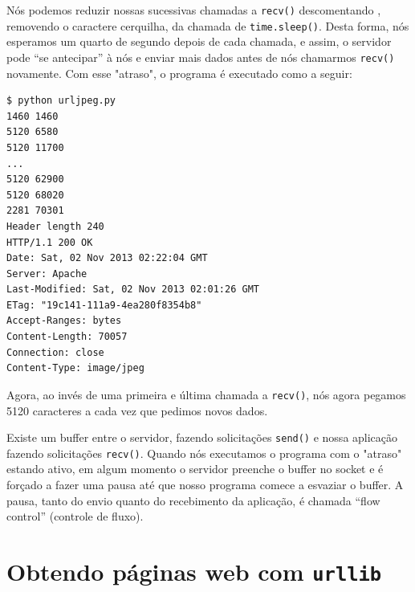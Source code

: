 Nós podemos reduzir nossas sucessivas chamadas a {\tt recv()} descomentando
, removendo o caractere cerquilha, da chamada de {\tt time.sleep()}.  
Desta forma, nós esperamos
um quarto de segundo depois de cada chamada, e assim, o servidor pode
``se antecipar'' à nós e enviar mais dados antes de nós chamarmos
{\tt recv()} novamente.  Com esse "atraso", o programa é executado
como a seguir:
\beforeverb
\begin{verbatim}
$ python urljpeg.py 
1460 1460
5120 6580
5120 11700
...
5120 62900
5120 68020
2281 70301
Header length 240
HTTP/1.1 200 OK
Date: Sat, 02 Nov 2013 02:22:04 GMT
Server: Apache
Last-Modified: Sat, 02 Nov 2013 02:01:26 GMT
ETag: "19c141-111a9-4ea280f8354b8"
Accept-Ranges: bytes
Content-Length: 70057
Connection: close
Content-Type: image/jpeg
\end{verbatim}
\afterverb

Agora, ao invés de uma primeira e última chamada a {\tt recv()}, nós agora
pegamos 5120 caracteres a cada vez que pedimos novos dados.  

Existe um buffer entre o servidor, fazendo solicitações {\tt send()} 
e nossa aplicação fazendo solicitações {\tt recv()}.  Quando nós
executamos o programa com o "atraso" estando ativo, em algum momento
o servidor preenche o buffer no socket e é forçado a fazer uma pausa
até que nosso programa comece a esvaziar o buffer.  A pausa, tanto do
envio quanto do recebimento da aplicação, é chamada ``flow control''
(controle de fluxo).

\section{Obtendo páginas web com {\tt urllib}}

